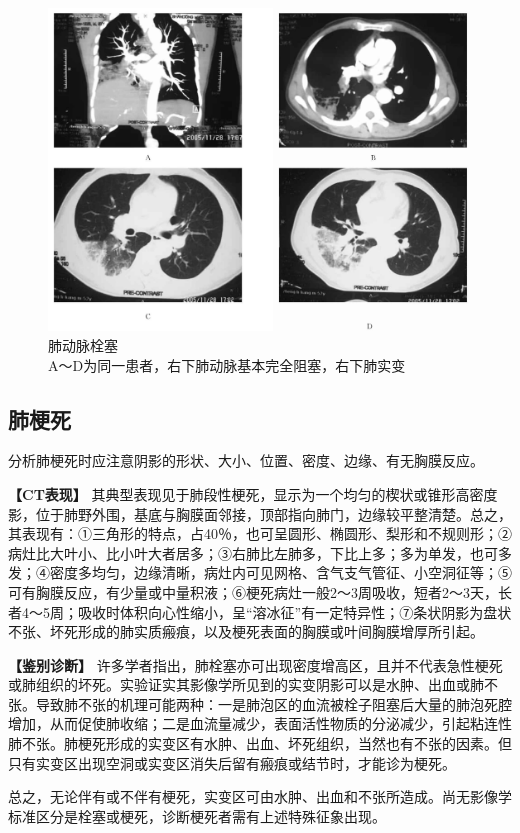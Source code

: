 \begin{figure}[!htbp]
 \centering
 \includegraphics[width=.7\textwidth,height=\textheight,keepaspectratio]{./images/Image00199.jpg}
 \captionsetup{justification=centering}
 \caption{肺动脉栓塞\\{\small A～D为同一患者，右下肺动脉基本完全阻塞，右下肺实变}}
 \label{fig9-15}
  \end{figure} 

\subsection{肺梗死}

分析肺梗死时应注意阴影的形状、大小、位置、密度、边缘、有无胸膜反应。

\textbf{【CT表现】}
其典型表现见于肺段性梗死，显示为一个均匀的楔状或锥形高密度影，位于肺野外围，基底与胸膜面邻接，顶部指向肺门，边缘较平整清楚。总之，其表现有：①三角形的特点，占40％，也可呈圆形、椭圆形、梨形和不规则形；②病灶比大叶小、比小叶大者居多；③右肺比左肺多，下比上多；多为单发，也可多发；④密度多均匀，边缘清晰，病灶内可见网格、含气支气管征、小空洞征等；⑤可有胸膜反应，有少量或中量积液；⑥梗死病灶一般2～3周吸收，短者2～3天，长者4～5周；吸收时体积向心性缩小，呈“溶冰征”有一定特异性；⑦条状阴影为盘状不张、坏死形成的肺实质瘢痕，以及梗死表面的胸膜或叶间胸膜增厚所引起。

\textbf{【鉴别诊断】}
许多学者指出，肺栓塞亦可出现密度增高区，且并不代表急性梗死或肺组织的坏死。实验证实其影像学所见到的实变阴影可以是水肿、出血或肺不张。导致肺不张的机理可能两种：一是肺泡区的血流被栓子阻塞后大量的肺泡死腔增加，从而促使肺收缩；二是血流量减少，表面活性物质的分泌减少，引起粘连性肺不张。肺梗死形成的实变区有水肿、出血、坏死组织，当然也有不张的因素。但只有实变区出现空洞或实变区消失后留有瘢痕或结节时，才能诊为梗死。

总之，无论伴有或不伴有梗死，实变区可由水肿、出血和不张所造成。尚无影像学标准区分是栓塞或梗死，诊断梗死者需有上述特殊征象出现。


